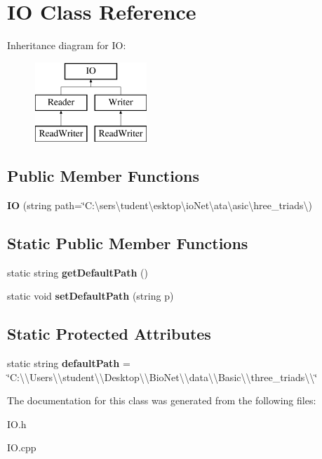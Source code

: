 \hypertarget{class_i_o}{}\section{IO Class Reference}
\label{class_i_o}
Inheritance diagram for IO\+:\begin{figure}[H]
\begin{center}
\leavevmode
\includegraphics[height=3.000000cm]{class_i_o}
\end{center}
\end{figure}
\subsection*{Public Member Functions}
\begin{DoxyCompactItemize}
\item 
\mbox{\label{class_i_o_ae8ab594ad6f653b7552fda638eec63a8}} 
{\bfseries IO} (string path=\char`\"{}C\+:\textbackslash{}sers\textbackslash{}tudent\textbackslash{}esktop\textbackslash{}io\+Net\textbackslash{}ata\textbackslash{}asic\textbackslash{}hree\+\_\+triads\textbackslash{})
\end{DoxyCompactItemize}
\subsection*{Static Public Member Functions}
\begin{DoxyCompactItemize}
\item 
\mbox{\label{class_i_o_af6385db5958f04392a7986fbf4af16db}} 
static string {\bfseries get\+Default\+Path} ()
\item 
\mbox{\label{class_i_o_a66ac356bf3ace0c37f1fccf6d3d1359c}} 
static void {\bfseries set\+Default\+Path} (string p)
\end{DoxyCompactItemize}
\subsection*{Static Protected Attributes}
\begin{DoxyCompactItemize}
\item 
\mbox{\label{class_i_o_afe39579558a542005c1be707e23abad0}} 
static string {\bfseries default\+Path} = \char`\"{}C\+:\textbackslash{}\textbackslash{}\+Users\textbackslash{}\textbackslash{}student\textbackslash{}\textbackslash{}\+Desktop\textbackslash{}\textbackslash{}\+Bio\+Net\textbackslash{}\textbackslash{}data\textbackslash{}\textbackslash{}\+Basic\textbackslash{}\textbackslash{}three\+\_\+triads\textbackslash{}\textbackslash{}\char`\"{}
\end{DoxyCompactItemize}


The documentation for this class was generated from the following files\+:\begin{DoxyCompactItemize}
\item 
I\+O.\+h\item 
I\+O.\+cpp\end{DoxyCompactItemize}
